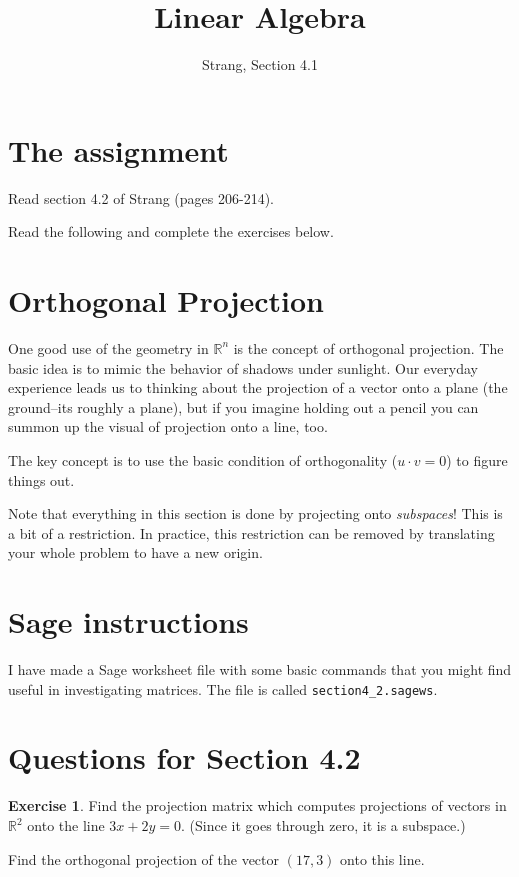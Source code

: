 \documentclass[11pt]{amsart}
\theoremstyle{definition}
\newtheorem{exercise}{Exercise}
\begin{document}
\title{Linear Algebra}
\author{Strang, Section 4.1}
\maketitle

\section{The assignment}
\begin{compactitem}
\item Read section 4.2 of Strang (pages 206-214).
\item Read the following and complete the exercises below.
\end{compactitem}


\section{Orthogonal Projection}

One good use of the geometry in $\mathbb{R}^n$ is the concept of orthogonal projection. The basic idea is to mimic the behavior of shadows under sunlight. Our everyday experience leads us to thinking about the projection of a vector onto a plane (the ground--its roughly a plane), but if you imagine holding out a pencil you can summon up the visual of projection onto a line, too.

The key concept is to use the basic condition of orthogonality ($u \cdot v = 0$) to figure things out.

Note that everything in this section is done by projecting onto \emph{subspaces}! This is a bit of a restriction. In practice, this restriction can be removed by translating your whole problem to have a new origin.

\section{Sage instructions}

I have made a Sage worksheet file with some basic commands that you might find useful in investigating matrices. The file is called \texttt{section4\_2.sagews}.


\section{Questions for Section 4.2}
\setcounter{exercise}{116}

\begin{exercise} Find the projection matrix which computes projections of vectors in $\mathbb{R}^2$ onto the line $3x+2y=0$. (Since it goes through zero, it is a subspace.)

Find the orthogonal projection of the vector $\left( 17,3 \right)$ onto this line.
\end{exercise}
\end{document}
